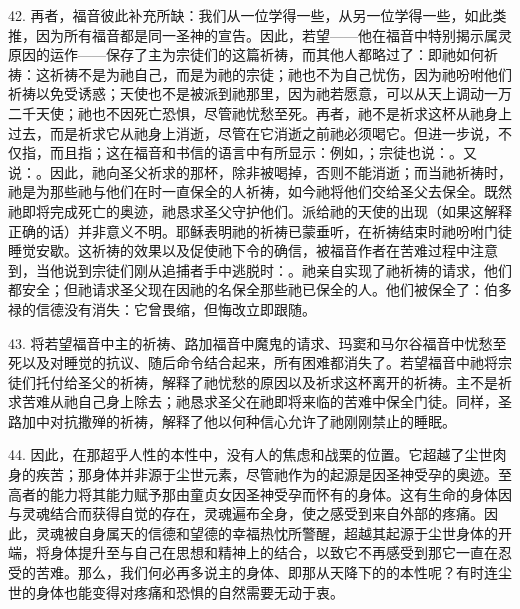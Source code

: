 42. 再者，福音彼此补充所缺：我们从一位学得一些，从另一位学得一些，如此类推，因为所有福音都是同一圣神的宣告。因此，若望——他在福音中特别揭示属灵原因的运作——保存了主为宗徒们的这篇祈祷，而其他人都略过了：即祂如何祈祷：这祈祷不是为祂自己，而是为祂的宗徒；祂也不为自己忧伤，因为祂吩咐他们祈祷以免受诱惑；天使也不是被派到祂那里，因为祂若愿意，可以从天上调动一万二千天使；祂也不因死亡恐惧，尽管祂忧愁至死。再者，祂不是祈求这杯从祂身上过去，而是祈求它从祂身上消逝，尽管在它消逝之前祂必须喝它。但进一步说，不仅指，而且指；这在福音和书信的语言中有所显示：例如，；宗徒也说：。又说：。因此，祂向圣父祈求的那杯，除非被喝掉，否则不能消逝；而当祂祈祷时，祂是为那些祂与他们在时一直保全的人祈祷，如今祂将他们交给圣父去保全。既然祂即将完成死亡的奥迹，祂恳求圣父守护他们。派给祂的天使的出现（如果这解释正确的话）并非意义不明。耶稣表明祂的祈祷已蒙垂听，在祈祷结束时祂吩咐门徒睡觉安歇。这祈祷的效果以及促使祂下令的确信，被福音作者在苦难过程中注意到，当他说到宗徒们刚从追捕者手中逃脱时：。祂亲自实现了祂祈祷的请求，他们都安全；但祂请求圣父现在因祂的名保全那些祂已保全的人。他们被保全了：伯多禄的信德没有消失：它曾畏缩，但悔改立即跟随。\par

43. 将若望福音中主的祈祷、路加福音中魔鬼的请求、玛窦和马尔谷福音中忧愁至死以及对睡觉的抗议、随后命令结合起来，所有困难都消失了。若望福音中祂将宗徒们托付给圣父的祈祷，解释了祂忧愁的原因以及祈求这杯离开的祈祷。主不是祈求苦难从祂自己身上除去；祂恳求圣父在祂即将来临的苦难中保全门徒。同样，圣路加中对抗撒殚的祈祷，解释了他以何种信心允许了祂刚刚禁止的睡眠。\par

44. 因此，在那超乎人性的本性中，没有人的焦虑和战栗的位置。它超越了尘世肉身的疾苦；那身体并非源于尘世元素，尽管祂作为的起源是因圣神受孕的奥迹。至高者的能力将其能力赋予那由童贞女因圣神受孕而怀有的身体。这有生命的身体因与灵魂结合而获得自觉的存在，灵魂遍布全身，使之感受到来自外部的疼痛。因此，灵魂被自身属天的信德和望德的幸福热忱所警醒，超越其起源于尘世身体的开端，将身体提升至与自己在思想和精神上的结合，以致它不再感受到那它一直在忍受的苦难。那么，我们何必再多说主的身体、即那从天降下的的本性呢？有时连尘世的身体也能变得对疼痛和恐惧的自然需要无动于衷。\par

